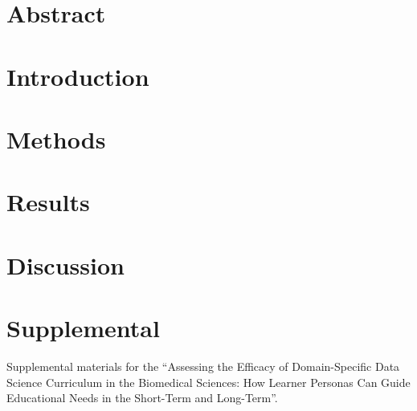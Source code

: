 \documentclass[../main.tex]{subfiles}
\begin{document}
    \section*{Abstract}

        

    \section{Introduction}

        

    \section{Methods}

        

    \section{Results}

        

    \section{Discussion}

        

    \section{Supplemental}

        Supplemental materials for the
        ``Assessing the Efficacy of Domain-Specific Data Science Curriculum in the Biomedical Sciences:
          How Learner Personas Can Guide Educational Needs in the Short-Term and Long-Term''.

        
        
        
\end{document}
